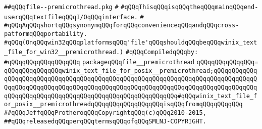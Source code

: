 \label{src/lib/std/src/posix/file--premicrothread.pkg}
\verb|##qQQqfile--premicrothread.pkg|\newline
\verb|#|\newline
\verb|#qQQqThisqQQqisqQQqtheqQQqmainqQQqend-userqQQqtextfileqQQqI/OqQQqinterface.|\newline
\verb|#|\newline
\verb|#qQQqAqQQqshortqQQqsynonymqQQqforqQQqconvenienceqQQqandqQQqcross-patformqQQqportability.|\newline
\verb|#qQQq(OnqQQqwin32qQQqplatformsqQQq'file'qQQqshouldqQQqbeqQQqwinix_text_file_for_win32__premicrothread.)|\newline
\newline
\verb|#qQQqCompiledqQQqby:|\newline
\verb|#qQQqqQQqqQQqqQQqqQQq|\newline
\newline
\verb|packageqQQqfile__premicrothread|\newline
\verb|qQQqqQQqqQQqqQQq=|\newline
\verb|qQQqqQQqqQQqqQQqwinix_text_file_for_posix__premicrothread;qQQqqQQqqQQqqQQqqQQqqQQqqQQqqQQqqQQqqQQqqQQqqQQqqQQqqQQqqQQqqQQqqQQqqQQqqQQqqQQqqQQqqQQqqQQqqQQqqQQqqQQqqQQqqQQqqQQqqQQqqQQqqQQqqQQqqQQqqQQqqQQqqQQqqQQqqQQqqQQqqQQqqQQqqQQqqQQqqQQqqQQqqQQqqQQqqQQqqQQq#qQQqwinix_text_file_for_posix__premicrothreadqQQqqQQqqQQqqQQqqQQqisqQQqfromqQQqqQQqqQQq|\newline
\newline
\newline
\newline
\newline
\verb|##qQQqJeffqQQqProtheroqQQqCopyrightqQQq(c)qQQq2010-2015,|\newline
\verb|##qQQqreleasedqQQqperqQQqtermsqQQqofqQQqSMLNJ-COPYRIGHT.|\newline

